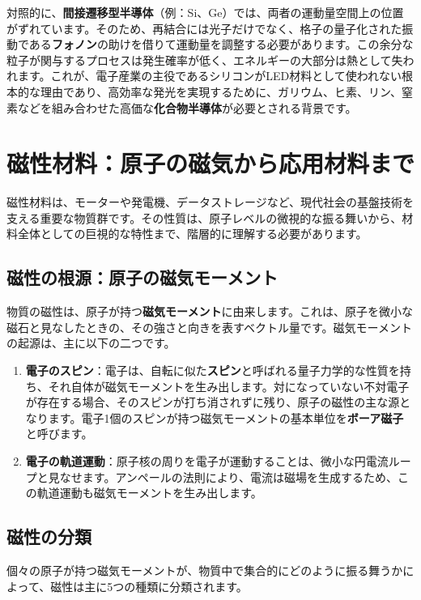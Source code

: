 \documentclass[11pt,a4paper]{ltjsarticle}
\begin{document}
対照的に、\textbf{間接遷移型半導体}（例：Si、Ge）では、両者の運動量空間上の位置がずれています。そのため、再結合には光子だけでなく、格子の量子化された振動である\textbf{フォノン}の助けを借りて運動量を調整する必要があります\cite{ref4}。この余分な粒子が関与するプロセスは発生確率が低く、エネルギーの大部分は熱として失われます。これが、電子産業の主役であるシリコンがLED材料として使われない根本的な理由であり、高効率な発光を実現するために、ガリウム、ヒ素、リン、窒素などを組み合わせた高価な\textbf{化合物半導体}が必要とされる背景です\cite{ref3}。

\section{磁性材料：原子の磁気から応用材料まで}

磁性材料は、モーターや発電機、データストレージなど、現代社会の基盤技術を支える重要な物質群です。その性質は、原子レベルの微視的な振る舞いから、材料全体としての巨視的な特性まで、階層的に理解する必要があります。

\subsection{磁性の根源：原子の磁気モーメント}

物質の磁性は、原子が持つ\textbf{磁気モーメント}に由来します。これは、原子を微小な磁石と見なしたときの、その強さと向きを表すベクトル量です。磁気モーメントの起源は、主に以下の二つです\cite{ref1}。
\begin{enumerate}
    \item \textbf{電子のスピン}：電子は、自転に似た\textbf{スピン}と呼ばれる量子力学的な性質を持ち、それ自体が磁気モーメントを生み出します。対になっていない不対電子が存在する場合、そのスピンが打ち消されずに残り、原子の磁性の主な源となります\cite{ref1}。電子1個のスピンが持つ磁気モーメントの基本単位を\textbf{ボーア磁子}と呼びます。
    \item \textbf{電子の軌道運動}：原子核の周りを電子が運動することは、微小な円電流ループと見なせます。アンペールの法則により、電流は磁場を生成するため、この軌道運動も磁気モーメントを生み出します\cite{ref1}。
\end{enumerate}

\subsection{磁性の分類}
個々の原子が持つ磁気モーメントが、物質中で集合的にどのように振る舞うかによって、磁性は主に5つの種類に分類されます。
\end{document}
